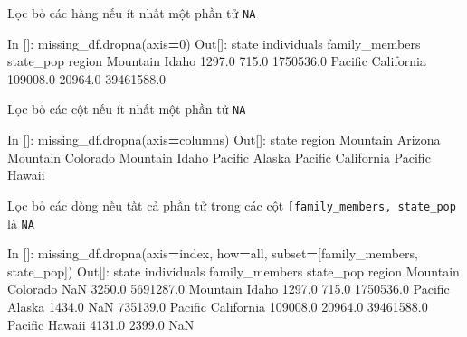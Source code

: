 \documentclass[
]{book}
\newenvironment{Shaded}{\begin{snugshade}}{\end{snugshade}}
\newcommand{\DecValTok}[1]{\textcolor[rgb]{0.00,0.00,0.81}{#1}}
\newcommand{\FloatTok}[1]{\textcolor[rgb]{0.00,0.00,0.81}{#1}}
\newcommand{\NormalTok}[1]{#1}
\newcommand{\OperatorTok}[1]{\textcolor[rgb]{0.81,0.36,0.00}{\textbf{#1}}}
\newcommand{\StringTok}[1]{\textcolor[rgb]{0.31,0.60,0.02}{#1}}
\begin{document}
Lọc bỏ các hàng nếu ít nhất một phần tử \texttt{NA}

\begin{Shaded}
\begin{Highlighting}[]
\NormalTok{In []: missing\_df.dropna(axis}\OperatorTok{=}\DecValTok{0}\NormalTok{)}
\NormalTok{Out[]:}
\NormalTok{               state  individuals  family\_members   state\_pop}
\NormalTok{region                                                       }
\NormalTok{Mountain       Idaho       }\FloatTok{1297.0}           \FloatTok{715.0}   \FloatTok{1750536.0}
\NormalTok{Pacific   California     }\FloatTok{109008.0}         \FloatTok{20964.0}  \FloatTok{39461588.0}
\end{Highlighting}
\end{Shaded}

Lọc bỏ các cột nếu ít nhất một phần tử \texttt{NA}

\begin{Shaded}
\begin{Highlighting}[]
\NormalTok{In []: missing\_df.dropna(axis}\OperatorTok{=}\StringTok{\textquotesingle{}columns\textquotesingle{}}\NormalTok{)}
\NormalTok{Out[]:}
\NormalTok{               state}
\NormalTok{region              }
\NormalTok{Mountain     Arizona}
\NormalTok{Mountain    Colorado}
\NormalTok{Mountain       Idaho}
\NormalTok{Pacific       Alaska}
\NormalTok{Pacific   California}
\NormalTok{Pacific       Hawaii}
\end{Highlighting}
\end{Shaded}

Lọc bỏ các dòng nếu tất cả phần tử trong các cột \texttt{{[}\textquotesingle{}family\_members\textquotesingle{},\ \textquotesingle{}state\_pop\textquotesingle{}{]}} là \texttt{NA}

\begin{Shaded}
\begin{Highlighting}[]
\NormalTok{In []: missing\_df.dropna(axis}\OperatorTok{=}\StringTok{\textquotesingle{}index\textquotesingle{}}\NormalTok{, how}\OperatorTok{=}\StringTok{\textquotesingle{}all\textquotesingle{}}\NormalTok{, subset}\OperatorTok{=}\NormalTok{[}\StringTok{\textquotesingle{}family\_members\textquotesingle{}}\NormalTok{, }\StringTok{\textquotesingle{}state\_pop\textquotesingle{}}\NormalTok{])}
\NormalTok{Out[]:}
\NormalTok{               state  individuals  family\_members   state\_pop}
\NormalTok{region                                                       }
\NormalTok{Mountain    Colorado          NaN          }\FloatTok{3250.0}   \FloatTok{5691287.0}
\NormalTok{Mountain       Idaho       }\FloatTok{1297.0}           \FloatTok{715.0}   \FloatTok{1750536.0}
\NormalTok{Pacific       Alaska       }\FloatTok{1434.0}\NormalTok{             NaN    }\FloatTok{735139.0}
\NormalTok{Pacific   California     }\FloatTok{109008.0}         \FloatTok{20964.0}  \FloatTok{39461588.0}
\NormalTok{Pacific       Hawaii       }\FloatTok{4131.0}          \FloatTok{2399.0}\NormalTok{         NaN}
\end{Highlighting}
\end{Shaded}
\end{document}
